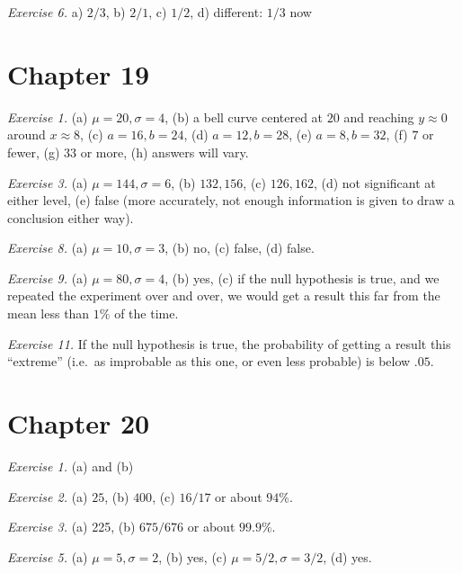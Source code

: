 \documentclass[justified]{tufte-book}
\theoremstyle{definition}
\theoremstyle{definition}
\theoremstyle{definition}
\theoremstyle{definition}
\theoremstyle{remark}
\begin{document}
\vspace{.5em}

\noindent
\emph{Exercise 6.} a) \(2/3\), b) \(2/1\), c) \(1/2\), d) different: \(1/3\) now

\hypertarget{chapter-19}{%
\section*{Chapter 19}\label{chapter-19}}

\noindent
\emph{Exercise 1.}
(a) \(\mu = 20, \sigma = 4\),
(b) a bell curve centered at \(20\) and reaching \(y \approx 0\) around \(x \approx 8\),
(c) \(a = 16, b = 24\),
(d) \(a = 12, b = 28\),
(e) \(a = 8, b = 32\),
(f) \(7\) or fewer,
(g) \(33\) or more,
(h) answers will vary.

\vspace{.5em}

\noindent
\emph{Exercise 3.}
(a) \(\mu = 144, \sigma = 6\),
(b) \(132, 156\),
(c) \(126, 162\),
(d) not significant at either level,
(e) false (more accurately, not enough information is given to draw a conclusion either way).

\vspace{.5em}

\noindent
\emph{Exercise 8.}
(a) \(\mu = 10, \sigma = 3\),
(b) no,
(c) false,
(d) false.

\vspace{.5em}

\noindent
\emph{Exercise 9.}
(a) \(\mu = 80, \sigma = 4\),
(b) yes,
(c) if the null hypothesis is true, and we repeated the experiment over and over, we would get a result this far from the mean less than \(1\%\) of the time.

\vspace{.5em}

\noindent
\emph{Exercise 11.} If the null hypothesis is true, the probability of getting a result this ``extreme'' (i.e.~as improbable as this one, or even less probable) is below \(.05\).

\hypertarget{chapter-20}{%
\section*{Chapter 20}\label{chapter-20}}

\noindent
\emph{Exercise 1.} (a) and (b)

\vspace{.5em}

\noindent
\emph{Exercise 2.} (a) \(25\), (b) \(400\), (c) \(16/17\) or about \(94\%\).

\vspace{.5em}

\noindent
\emph{Exercise 3.} (a) 225, (b) \(675/676\) or about \(99.9\%\).

\vspace{.5em}

\noindent
\emph{Exercise 5.} (a) \(\mu = 5, \sigma = 2\), (b) yes, (c) \(\mu = 5/2, \sigma = 3/2\), (d) yes.
\end{document}
